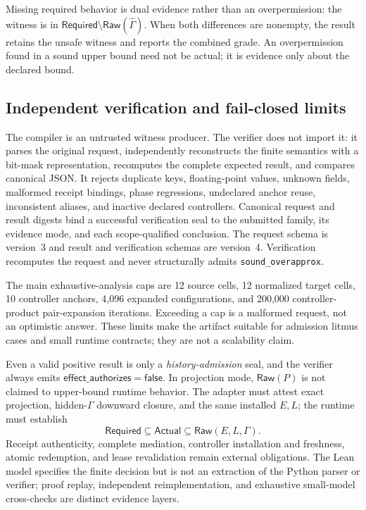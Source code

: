 Missing required behavior is dual evidence rather than an overpermission:
the witness is in
$\mathsf{Required}\setminus\mathsf{Raw}(\widehat\Gamma)$.
When both differences are nonempty, the result retains the unsafe witness and
reports the combined grade.  An overpermission found in a sound upper bound
need not be actual; it is evidence only about the declared bound.

\subsection{Independent verification and fail-closed limits}

The compiler is an untrusted witness producer.
The verifier does not import it: it parses the original request, independently
reconstructs the finite semantics with a bit-mask representation, recomputes
the complete expected result, and compares canonical JSON.
It rejects duplicate keys, floating-point values, unknown fields, malformed
receipt bindings, phase regressions, undeclared anchor reuse, inconsistent
aliases, and inactive declared controllers.
Canonical request and result digests bind a successful verification seal to
the submitted family, its evidence mode, and each scope-qualified conclusion.
The request schema is version~3 and result and verification schemas are
version~4.  Verification recomputes the request and never structurally admits
\texttt{sound\_overapprox}.

The main exhaustive-analysis caps are 12 source cells, 12 normalized target
cells, 10 controller anchors, 4,096 expanded configurations, and 200,000
controller-product pair-expansion iterations.
Exceeding a cap is a malformed request, not an optimistic answer.
These limits make the artifact suitable for admission litmus cases and small
runtime contracts; they are not a scalability claim.

Even a valid positive result is only a \emph{history-admission} seal, and the
verifier always emits $\mathsf{effect\_authorizes}=\mathsf{false}$.  In
projection mode, $\mathsf{Raw}(P)$ is not claimed to upper-bound runtime
behavior.  The adapter must attest exact projection, hidden-$\Gamma$ downward
closure, and the same installed $E,L$; the runtime must establish
\[
  \mathsf{Required}\subseteq\mathsf{Actual}
  \subseteq\mathsf{Raw}(E,L,\Gamma).
\]
Receipt authenticity, complete mediation, controller installation and
freshness, atomic redemption, and lease revalidation remain external
obligations.
The Lean model specifies the finite decision but is not an extraction of the
Python parser or verifier; proof replay, independent reimplementation, and
exhaustive small-model cross-checks are distinct evidence layers.
